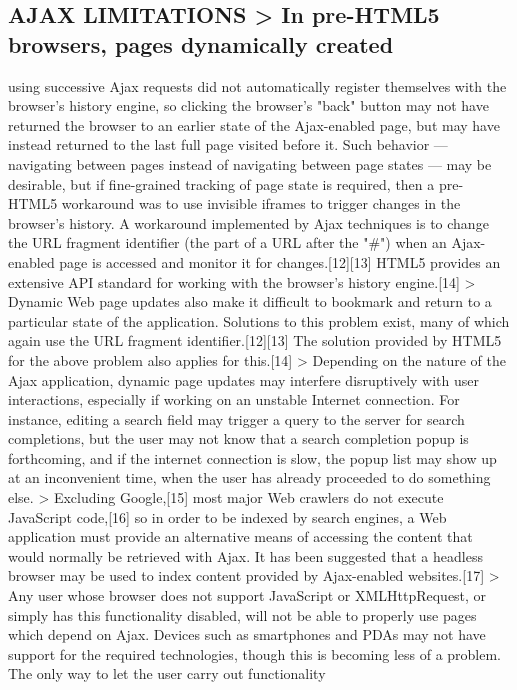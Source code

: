 \documentclass[11pt,a4paper]{article}
\begin{document}
\subsection{ AJAX LIMITATIONS > In pre-HTML5 browsers, pages dynamically created}
using successive Ajax requests did not automatically register themselves
with the browser's history engine, so clicking the browser's "back"
button may not have returned the browser to an earlier state of the
Ajax-enabled page, but may have instead returned to the last full page
visited before it. Such behavior — navigating between pages instead of
navigating between page states — may be desirable, but if fine-grained
tracking of page state is required, then a pre-HTML5 workaround
was to use invisible iframes to trigger changes in the browser's
history. A workaround implemented by Ajax techniques is to change
the URL fragment identifier (the part of a URL after the "#") when
an Ajax-enabled page is accessed and monitor it for changes.[12][13]
HTML5 provides an extensive API standard for working with the browser's
history engine.[14] > Dynamic Web page updates also make it difficult
to bookmark and return to a particular state of the application.
Solutions to this problem exist, many of which again use the URL
fragment identifier.[12][13] The solution provided by HTML5 for the
above problem also applies for this.[14] > Depending on the nature of
the Ajax application, dynamic page updates may interfere disruptively
with user interactions, especially if working on an unstable Internet
connection. For instance, editing a search field may trigger a query
to the server for search completions, but the user may not know that a
search completion popup is forthcoming, and if the internet connection
is slow, the popup list may show up at an inconvenient time, when the
user has already proceeded to do something else. > Excluding Google,[15]
most major Web crawlers do not execute JavaScript code,[16] so in
order to be indexed by search engines, a Web application must provide
an alternative means of accessing the content that would normally be
retrieved with Ajax. It has been suggested that a headless browser may
be used to index content provided by Ajax-enabled websites.[17] > Any
user whose browser does not support JavaScript or XMLHttpRequest, or
simply has this functionality disabled, will not be able to properly use
pages which depend on Ajax. Devices such as smartphones and PDAs may
not have support for the required technologies, though this is becoming
less of a problem. The only way to let the user carry out functionality
\end{document}
